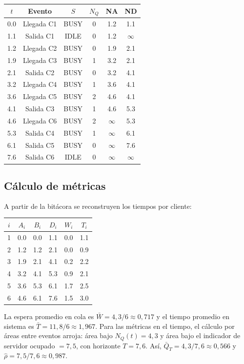 \documentclass[11pt, letterpaper]{article}
\begin{document}
\begin{center}
\small
\begin{tabular}{@{}cccccc@{}}
\toprule
$t$ & Evento & $S$ & $N_Q$ & NA & ND \\
\midrule
0.0 & Llegada C1 & BUSY & 0 & 1.2 & 1.1 \\
1.1 & Salida C1 & IDLE & 0 & 1.2 & $\infty$ \\
1.2 & Llegada C2 & BUSY & 0 & 1.9 & 2.1 \\
1.9 & Llegada C3 & BUSY & 1 & 3.2 & 2.1 \\
2.1 & Salida C2 & BUSY & 0 & 3.2 & 4.1 \\
3.2 & Llegada C4 & BUSY & 1 & 3.6 & 4.1 \\
3.6 & Llegada C5 & BUSY & 2 & 4.6 & 4.1 \\
4.1 & Salida C3 & BUSY & 1 & 4.6 & 5.3 \\
4.6 & Llegada C6 & BUSY & 2 & $\infty$ & 5.3 \\
5.3 & Salida C4 & BUSY & 1 & $\infty$ & 6.1 \\
6.1 & Salida C5 & BUSY & 0 & $\infty$ & 7.6 \\
7.6 & Salida C6 & IDLE & 0 & $\infty$ & $\infty$ \\
\bottomrule
\end{tabular}
\end{center}

\subsection{Cálculo de métricas}

A partir de la bitácora se reconstruyen los tiempos por cliente:

\begin{center}
\small
\begin{tabular}{@{}cccccc@{}}
\toprule
$i$ & $A_i$ & $B_i$ & $D_i$ & $W_i$ & $T_i$ \\
\midrule
1 & 0.0 & 0.0 & 1.1 & 0.0 & 1.1 \\
2 & 1.2 & 1.2 & 2.1 & 0.0 & 0.9 \\
3 & 1.9 & 2.1 & 4.1 & 0.2 & 2.2 \\
4 & 3.2 & 4.1 & 5.3 & 0.9 & 2.1 \\
5 & 3.6 & 5.3 & 6.1 & 1.7 & 2.5 \\
6 & 4.6 & 6.1 & 7.6 & 1.5 & 3.0 \\
\bottomrule
\end{tabular}
\end{center}

La espera promedio en cola es $\bar{W} = 4{,}3/6 \approx 0{,}717$ y el tiempo promedio en sistema es $\bar{T} = 11{,}8/6 \approx 1{,}967$. Para las métricas en el tiempo, el cálculo por áreas entre eventos arroja: área bajo $N_Q(t) = 4{,}3$ y área bajo el indicador de servidor ocupado $= 7{,}5$, con horizonte $T = 7{,}6$. Así, $\bar{Q}_T = 4{,}3/7{,}6 \approx 0{,}566$ y $\hat{\rho} = 7{,}5/7{,}6 \approx 0{,}987$.
\end{document}
